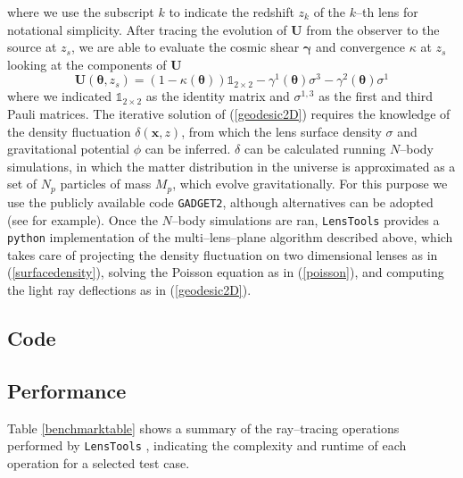\documentclass[reprint,aps,prd,superscriptaddress,showkeys,showpacs]{revtex4-1}
\newcommand{\bb}[1]{\mathbf{#1}}
\newcommand{\ttt}[1]{\texttt{#1}}
\newcommand{\LT}{\texttt{LensTools} }
\begin{document}
%
where we use the subscript $k$ to indicate the redshift $z_k$ of the $k$--th lens for notational simplicity. After tracing the evolution of $\bb{U}$ from the observer to the source at $z_s$, we are able to evaluate the cosmic shear $\pmb{\gamma}$ and convergence $\kappa$ at $z_s$ looking at the components of $\bb{U}$
\begin{equation}
\bb{U}(\pmb{\theta},z_s) = (1-\kappa(\pmb{\theta}))\mathds{1}_{2\times2} - \gamma^1(\pmb{\theta})\sigma^3 - \gamma^2(\pmb{\theta})\sigma^1
\end{equation}
%
where we indicated $\mathds{1}_{2\times2}$ as the identity matrix and $\sigma^{1,3}$ as the first and third Pauli matrices. The iterative solution of (\ref{geodesic2D}) requires the knowledge of the density fluctuation $\delta(\bb{x},z)$, from which the lens surface density $\sigma$ and gravitational potential $\phi$ can be inferred. $\delta$ can be calculated running $N$--body simulations, in which the matter distribution in the universe is approximated as a set of $N_p$ particles of mass $M_p$, which evolve gravitationally. For this purpose we use the publicly available code \ttt{GADGET2}\citep{Gadget2}, although alternatives can be adopted (see \citep{HACC} for example). Once the $N$--body simulations are ran, \LT provides a \ttt{python} implementation of the multi--lens--plane algorithm \citep{RayTracingHartlap} described above, which takes care of projecting the density fluctuation on two dimensional lenses as in (\ref{surfacedensity}), solving the Poisson equation as in (\ref{poisson}), and computing the light ray deflections as in (\ref{geodesic2D}). 

\subsection{Code}
%

\subsection{Performance}
%
Table \ref{benchmarktable} shows a summary of the ray--tracing operations performed by \LT, indicating the complexity and runtime of each operation for a selected test case.  
\end{document}
